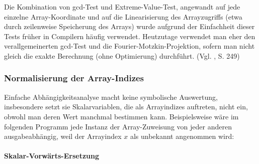 Die Kombination von gcd-Test und Extreme-Value-Test, angewandt auf jede
einzelne Array-Koordinate und auf die Linearisierung des Arrayzugriffs
(etwa durch zeilenweise Speicherung des Arrays) wurde aufgrund der
Einfachheit dieser Tests früher in Compilern häufig
verwendet. Heutzutage verwendet man eher den verallgemeinerten gcd-Test
und die Fourier-Motzkin-Projektion, sofern man nicht gleich die exakte
Berechnung (ohne Optimierung) durchführt. (Vgl. \cite{Wol95}, S. 249)



\def\ins{\hspace{.5cm}}


\subsubsection{Normalisierung der Array-Indizes}

Einfache Abhängigkeitsanalyse macht keine symbolische Auswertung,
insbesondere setzt sie Skalarvariablen, die als Arrayindizes auftreten,
nicht ein, obwohl man deren Wert manchmal bestimmen kann. Beispielsweise
wäre im folgenden Programm jede Instanz der Array-Zuweisung von jeder
anderen ausgabeabhängig, weil der Arrayindex $x$ als unbekannt
angenommen wird:


\begin{procedure}
\SetAlgoLined
{}
\end{procedure}

\paragraph{Skalar-Vorwärts-Ersetzung}
\label{sec:sve}

